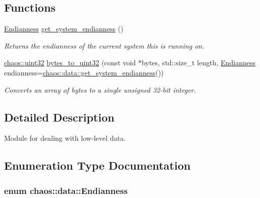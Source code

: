 \subsection*{Functions}
\begin{DoxyCompactItemize}
\item 
\hypertarget{namespacechaos_1_1data_a853118d28d026784faad6673bbcf526f}{}\hyperlink{namespacechaos_1_1data_adb2657d50c0b84cdc1153001031bbf3f}{Endianness} \hyperlink{namespacechaos_1_1data_a853118d28d026784faad6673bbcf526f}{get\+\_\+system\+\_\+endianness} ()\label{namespacechaos_1_1data_a853118d28d026784faad6673bbcf526f}

\begin{DoxyCompactList}\small\item\em Returns the endianness of the current system this is running on. \end{DoxyCompactList}\item 
\hyperlink{namespacechaos_a8641b3ae4551f0b35570d4f9f4ec22d9}{chaos\+::uint32} \hyperlink{namespacechaos_1_1data_af4310ad815f14c278c83c5abb3abc251}{bytes\+\_\+to\+\_\+uint32} (const void $\ast$bytes, std\+::size\+\_\+t length, \hyperlink{namespacechaos_1_1data_adb2657d50c0b84cdc1153001031bbf3f}{Endianness} endianness=\hyperlink{namespacechaos_1_1data_a853118d28d026784faad6673bbcf526f}{chaos\+::data\+::get\+\_\+system\+\_\+endianness}())
\begin{DoxyCompactList}\small\item\em Converts an array of bytes to a single unsigned 32-\/bit integer. \end{DoxyCompactList}\end{DoxyCompactItemize}


\subsection{Detailed Description}
Module for dealing with low-\/level data. 

\subsection{Enumeration Type Documentation}
\hypertarget{namespacechaos_1_1data_adb2657d50c0b84cdc1153001031bbf3f}{}
\subsubsection[{Endianness}]{\setlength{\rightskip}{0pt plus 5cm}enum {\bf chaos\+::data\+::\+Endianness}}\label{namespacechaos_1_1data_adb2657d50c0b84cdc1153001031bbf3f}


